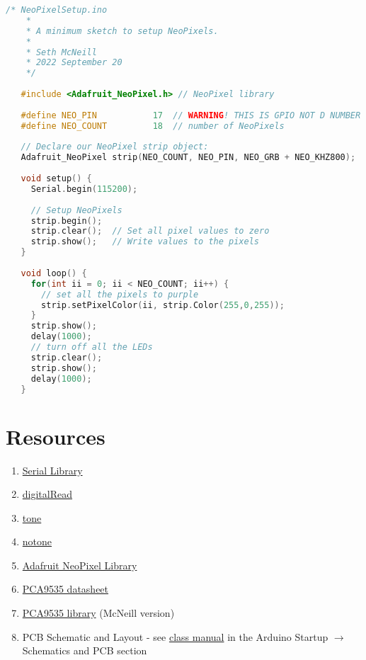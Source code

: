 \begin{lstlisting}[language=C++, caption={This snippet shows how to setup and run the NeoPixels on the board.},label={lst:neopixelsetup}]
    /* NeoPixelSetup.ino
    * 
    * A minimum sketch to setup NeoPixels.
    * 
    * Seth McNeill
    * 2022 September 20
    */
   
   #include <Adafruit_NeoPixel.h> // NeoPixel library
   
   #define NEO_PIN           17  // WARNING! THIS IS GPIO NOT D NUMBER for NeoPixels
   #define NEO_COUNT         18  // number of NeoPixels
   
   // Declare our NeoPixel strip object:
   Adafruit_NeoPixel strip(NEO_COUNT, NEO_PIN, NEO_GRB + NEO_KHZ800);
   
   void setup() {
     Serial.begin(115200);
   
     // Setup NeoPixels
     strip.begin();
     strip.clear();  // Set all pixel values to zero
     strip.show();   // Write values to the pixels
   }
   
   void loop() {
     for(int ii = 0; ii < NEO_COUNT; ii++) {
       // set all the pixels to purple
       strip.setPixelColor(ii, strip.Color(255,0,255));
     }
     strip.show();
     delay(1000);
     // turn off all the LEDs
     strip.clear();
     strip.show();
     delay(1000);
   }   
\end{lstlisting}

\section{Resources}\label{sec:resources}
\begin{enumerate}
    \item \href{https://www.arduino.cc/reference/en/language/functions/communication/serial/}{Serial Library}
    \item \href{https://www.arduino.cc/reference/en/language/functions/digital-io/digitalread/}{digitalRead}
    \item \href{https://www.arduino.cc/reference/en/language/functions/advanced-io/tone/}{tone}
    \item \href{https://www.arduino.cc/reference/en/language/functions/advanced-io/notone/}{notone}
    \item \href{https://www.arduino.cc/reference/en/libraries/adafruit-neopixel/}{Adafruit NeoPixel Library}
    \item \href{https://www.nxp.com/docs/en/data-sheet/PCA9535_PCA9535C.pdf}{PCA9535 datasheet}
    \item \href{https://github.com/semcneil/PCA95x5}{PCA9535 library} (McNeill version)
    \item PCB Schematic and Layout - see 
            \href{https://github.com/semcneil/Fundamentals-of-Microcontrollers-Manual}{class manual} 
            in the Arduino Startup $\rightarrow$ Schematics and PCB section
\end{enumerate}

